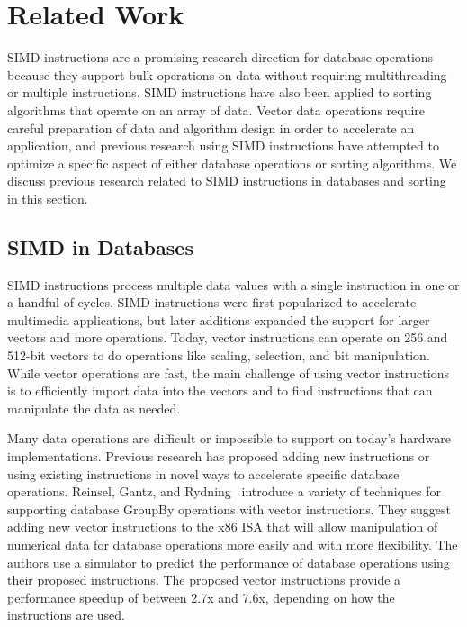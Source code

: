 \documentclass[10pt,twocolumn]{article}
\begin{document}
\section{Related Work}
SIMD instructions are a promising research direction for database operations because they support bulk operations on data without requiring multithreading or multiple instructions.  SIMD instructions have also been applied to sorting algorithms that operate on an array of data.  Vector data operations require careful preparation of data and algorithm design in order to accelerate an application, and previous research using SIMD instructions have attempted to optimize a specific aspect of either database operations or sorting algorithms.  We discuss previous research related to SIMD instructions in databases and sorting in this section.

\subsection{SIMD in Databases}
SIMD instructions process multiple data values with a single instruction in one or a handful of cycles.  SIMD instructions were first popularized to accelerate multimedia applications, but later additions expanded the support for larger vectors and more operations.  Today, vector instructions can operate on 256 and 512-bit vectors to do operations like scaling, selection, and bit manipulation.  While vector operations are fast, the main challenge of using vector instructions is to efficiently import data into the vectors and to find instructions that can manipulate the data as needed.

Many data operations are difficult or impossible to support on today's hardware implementations.  Previous research has proposed adding new instructions or using existing instructions in novel ways to accelerate specific database operations.   Reinsel, Gantz, and Rydning~\cite{p1} introduce a variety of techniques for supporting database GroupBy operations with vector instructions.  They suggest adding new vector instructions to the x86 ISA that will allow manipulation of numerical data for database operations more easily and with more flexibility.  The authors use a simulator to predict the performance of database operations using their proposed instructions.  The proposed vector instructions provide a performance speedup of between 2.7x and 7.6x, depending on how the instructions are used.  
\end{document}
